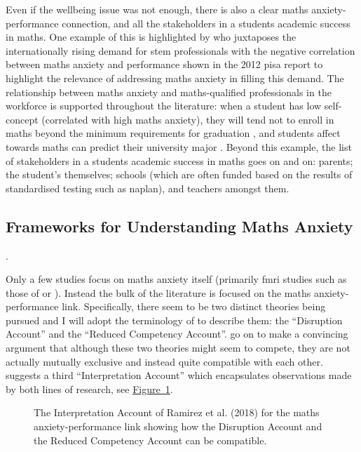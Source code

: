 \documentclass[twoside,12pt,a4paper]{report}
\newcommand{\reffig}[1]{\hyperref[fig:#1]{Figure~\ref{fig:#1}}}
\begin{document}
Even if the wellbeing issue was not enough, there is also a clear maths anxiety-performance connection, and all the stakeholders in a students academic success in maths. One example of this is highlighted by  who juxtaposes the internationally rising demand for \gls{stem} professionals with the negative correlation between maths anxiety and performance shown in the 2012 \gls{pisa} report \cite{PISA2013} to highlight the relevance of addressing maths anxiety in filling this demand. The relationship between maths anxiety and maths-qualified professionals in the workforce is supported throughout the literature: when a student has low self-concept (correlated with high maths anxiety), they will tend not to enroll in maths beyond the minimum requirements for graduation \cite{Ashcraft2007book}, and students affect towards maths can predict their university major \cite{LeFevre1992}. Beyond this example, the list of stakeholders in a students academic success in maths goes on and on: parents; the student's themselves; schools (which are often funded based on the results of standardised testing such as \gls{naplan}), and teachers amongst them. 



\subsection*{Frameworks for Understanding Maths Anxiety}.

Only a few studies focus on maths anxiety itself (primarily \gls{fmri} studies such as those of   or ). Instead the bulk of the literature is focused on the maths anxiety-performance link.  Specifically, there seem to be two distinct theories being pursued and I will adopt the terminology of  to describe them: the ``Disruption Account'' and the ``Reduced Competency Account''.  go on to make a convincing argument that although these two theories might seem to compete, they are not actually mutually exclusive and instead quite compatible with each other.  suggests a third ``Interpretation Account'' which encapsulates observations made by both lines of research, see \reffig{ramirez}.

\begin{figure}[b]
\begin{center}
\end{center}
\caption{The Interpretation Account of Ramirez et al. (2018) for the maths anxiety-performance link showing how the Disruption Account and the Reduced Competency Account can be compatible.
\label{fig:ramirez}}
\end{figure}
\end{document}
